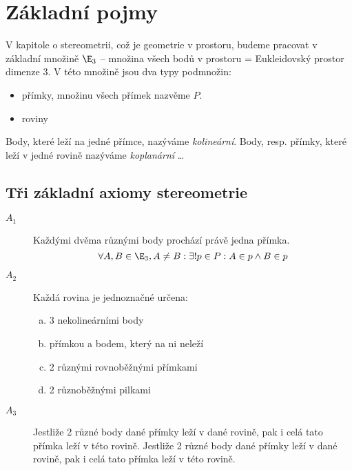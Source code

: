 
\let\braceru=\relax \let\bracelu=\relax 
\def\o#1{\setbox0=
	\hbox{$\kern2pt\overbrace{\kern-2pt#1\kern-2pt}\kern2pt$}\ht0=2.1ex\box0}
\def\to#1{\hbox{#1\rlap{\t{}}}}
\def\rad{\rm{rad}}
\def\f{\frac}
\BeginDoc{}
\section{Základní pojmy}
\Poz V kapitole o stereometrii, což je geometrie v prostoru, budeme pracovat v základní množině $\E_3$ -- množina všech bodů v prostoru = 
Eukleidovský prostor dimenze 3.
V této množině jsou dva typy podmnožin:
\begin{itemize}
	\item přímky, množinu všech přímek nazvěme $P$.
	\item roviny
\end{itemize}
\Def Body, které leží na jedné přímce, nazýváme \emph{kolineární}. Body, resp. přímky, které leží v jedné rovině nazýváme \emph{koplanární}
{\Huge\dots}
\subsection{Tři základní axiomy stereometrie}
\begin{description}
	\item[$A_1$] Každými dvěma různými body prochází právě jedna přímka.
		$$\forall A,B \in \E_3 ,A\ne B: \exists! p \in P: A\in p \land B\in p$$
	\item[$A_2$] Každá rovina je jednoznačné určena:
		\begin{enumerate}[a)]
			\item 3 nekolineárními body
			\item přímkou a bodem, který na ni neleží
			\item 2 různými rovnoběžnými přímkami
			\item 2 různoběžnými pilkami
		\end{enumerate}
	\item[$A_3$] Jestliže 2 různé body dané přímky leží v dané rovině, pak i celá tato přímka leží v této rovině. 
		Jestliže 2 různé body dané přímky leží v dané rovině, pak i celá tato přímka leží v této rovině.
\end{description}


\EndDoc
